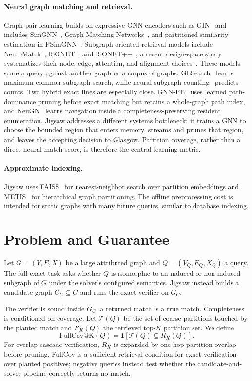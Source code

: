 \documentclass[runningheads]{llncs}
\begin{document}
\paragraph{Neural graph matching and retrieval.}
Graph-pair learning builds on expressive GNN encoders such as GIN~\cite{ref_gin} and includes SimGNN~\cite{ref_simgnn}, Graph Matching Networks~\cite{ref_gmn}, and partitioned similarity estimation in PSimGNN~\cite{ref_psimgnn}. Subgraph-oriented retrieval models include NeuroMatch~\cite{ref_neuromatch}, ISONET~\cite{ref_isonet}, and ISONET++~\cite{ref_isonetpp}; a recent design-space study systematizes their node, edge, attention, and alignment choices~\cite{ref_neuraldesign}. These models score a query against another graph or a corpus of graphs. GLSearch~\cite{ref_glsearch} learns maximum-common-subgraph search, while neural subgraph counting~\cite{ref_nsic} predicts counts. Two hybrid exact lines are especially close. GNN-PE~\cite{ref_gnnpe} uses learned path-dominance pruning before exact matching but retains a whole-graph path index, and NeuGN~\cite{ref_neugn} learns navigation inside a completeness-preserving resident enumeration. Jigsaw addresses a different systems bottleneck: it trains a GNN to choose the bounded region that enters memory, streams and prunes that region, and leaves the accepting decision to Glasgow. Partition coverage, rather than a direct neural match score, is therefore the central learning metric.

\paragraph{Approximate indexing.}
Jigsaw uses FAISS~\cite{ref_faiss} for nearest-neighbor search over partition embeddings and METIS~\cite{ref_metis} for hierarchical graph partitioning. The offline preprocessing cost is intended for static graphs with many future queries, similar to database indexing.

\section{Problem and Guarantee}

Let $G=(V,E,X)$ be a large attributed graph and $Q=(V_Q,E_Q,X_Q)$ a query. The full exact task asks whether $Q$ is isomorphic to an induced or non-induced subgraph of $G$ under the solver's configured semantics. Jigsaw instead builds a candidate graph $G_C \subseteq G$ and runs the exact verifier on $G_C$.

The verifier is sound inside $G_C$: a returned match is a true match. Completeness is conditioned on coverage. Let $\mathcal{T}(Q)$ be the set of coarse partitions touched by the planted match and $R_K(Q)$ the retrieved top-$K$ partition set. We define
\begin{equation}
\mathrm{FullCov@K}(Q)=\mathbf{1}\left[\mathcal{T}(Q)\subseteq R_K(Q)\right].
\end{equation}
For overlap-cascade verification, $R_K$ is expanded by one-hop partition overlap before pruning. FullCov is a sufficient retrieval condition for exact verification over planted positives; negative queries instead test whether the candidate-and-solver pipeline correctly returns no match.
\end{document}
